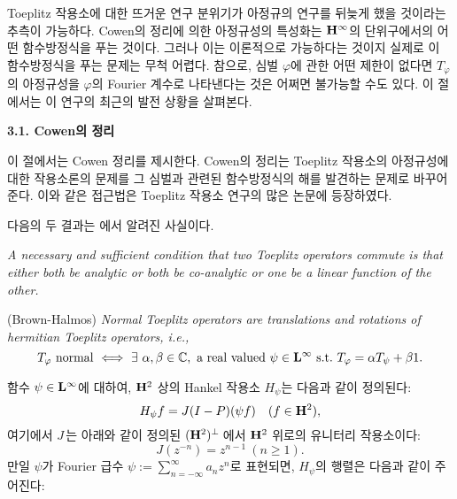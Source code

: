 \documentclass[12pt,a4paper,2sided]{article}
\newcommand{\vs}{\vspace}
\begin{document}
\newpage
{}
\vspace{.8 cm}


\noindent  Toeplitz 작용소에 대한 뜨거운 연구 분위기가 아정규의
연구를 뒤늦게 했을 것이라는 추측이 가능하다. Cowen의 정리에 의한
아정규성의 특성화는 $\bold H^{\infty}$의 단위구에서의 어떤
함수방정식을 푸는 것이다. 그러나 이는 이론적으로 가능하다는 것이지
실제로 이 함수방정식을 푸는 문제는 무척 어렵다. 참으로, 심벌
$\varphi$에 관한 어떤 제한이 없다면 $T_{\varphi}$의 아정규성을
$\varphi$의 Fourier 계수로 나타낸다는 것은 어쩌면 불가능할 수도
있다. 이 절에서는 이 연구의 최근의 발전 상황을 살펴본다.

\vspace{.3 cm} {\bf 3.1. Cowen의 정리} \vspace{.3 cm}

이 절에서는 Cowen 정리를 제시한다. Cowen의 정리는 Toeplitz 작용소의
아정규성에 대한 작용소론의 문제를 그 심벌과 관련된 함수방정식의 해를
발견하는 문제로 바꾸어 준다. 이와 같은 접근법은 Toeplitz 작용소
연구의 많은 논문에 등장하였다.

\vs{0.3cm} 다음의 두 결과는 \cite{BH}에서 알려진 사실이다.

\vs{0.3cm}{\bf Lemma 3.1.1.} {\sl A necessary and sufficient
condition that two Toeplitz operators commute is that either both be
analytic or both be co-analytic or one be a linear function of the
other.}

\vs{0.3cm}{\bf Theorem 3.1.2.} {\rm(Brown-Halmos) \cite{BH}} {\sl
Normal Toeplitz operators are translations and rotations of
hermitian Toeplitz operators, i.e.,
$$
T_\varphi\ \mbox{normal}\ \Longleftrightarrow\ \exists\ \alpha,\beta\in\mathbb{C},
\ \mbox{a real valued}\ \psi\in {\bold L}^{\infty}\ \mbox{s.t.}\
T_{\varphi}=\alpha T_{\psi} +\beta 1.
$$}

함수 $\psi\in{\bold L}^{\infty}$에 대하여, ${\bold H}^2$ 상의 Hankel
작용소 $H_\psi$는 다음과 같이 정의된다:
$$
H_{\psi}f=J(I-P)(\psi f)\quad (f\in {\bold H}^{2}),
$$
여기에서 $J$\,는 아래와 같이 정의된 $({{\bold H}^2})^{\perp}$\,에서
${\bold H}^2$ 위로의 유니터리 작용소이다:
$$
J(z^{-n})=z^{n-1}\ (n\ge 1).
$$
\medskip
만일 $\psi$가 Fourier 급수 $\psi:=\sum_{n=-\infty}^{\infty}a_n
z^n$로 표현되면, $H_\psi$의 행렬은 다음과 같이 주어진다:

\bigskip\bigskip

\newpage\leftline{\large{\it 180}\ \ \ \small 학문 연구의
동향과 쟁점 -- 수학}  \vspace{0.3cm}
\end{document}
